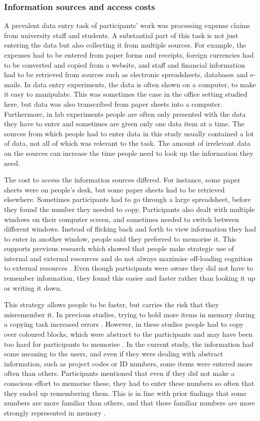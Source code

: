\documentclass[11pt,oneside]{report}
\begin{document}
\subsubsection{Information sources and access costs}
A prevalent data entry task of participants' work was processing expense claims from university staff and students. A substantial part of this task is not just entering the data but also collecting it from multiple sources. For example, the expenses had to be entered from paper forms and receipts, foreign currencies had to be converted and copied from a website, and staff and financial information had to be retrieved from sources such as electronic spreadsheets, databases and e-mails. 
In data entry experiments, the data is often shown on a computer, to make it easy to manipulate. This was sometimes the case in the office setting studied here, but data was also transcribed from paper sheets into a computer. Furthermore, in lab experiments people are often only presented with the data they have to enter and sometimes are given only one data item at a time. The sources from which people had to enter data in this study usually contained a lot of data, not all of which was relevant to the task. The amount of irrelevant data on the sources can increase the time people need to look up the information they need.

The cost to access the information sources differed. For instance, some paper sheets were on people's desk, but some paper sheets had to be retrieved elsewhere. Sometimes participants had to go through a large spreadsheet, before they found the number they needed to copy. Participants also dealt with multiple windows on their computer screen, and sometimes needed to switch between different windows. Instead of flicking back and forth to view information they had to enter in another window, people said they preferred to memorise it. This supports previous research which showed that people make strategic use of internal and external resources and do not always maximise off-loading cognition to external resources \citep{Gray2006}. Even though participants were aware they did not have to remember information, they found this easier and faster rather than looking it up or writing it down. 

This strategy allows people to be faster, but carries the risk that they misremember it. In previous studies, trying to hold more items in memory during a copying task increased errors \citep[e.g.][]{Morgan2009}. However, in these studies people had to copy over coloured blocks, which were abstract to the participants and may have been too hard for participants to memorise \citep{Waldron2011}. In the current study, the information had some meaning to the users, and even if they were dealing with abstract information, such as project codes or ID numbers, some items were entered more often than others. Participants mentioned that even if they did not make a conscious effort to memorise these, they had to enter these numbers so often that they ended up remembering them. This is in line with prior findings that some numbers are more familiar than others, and that these familiar numbers are more strongly represented in memory \citep{Wiseman2014}. 
\end{document}
